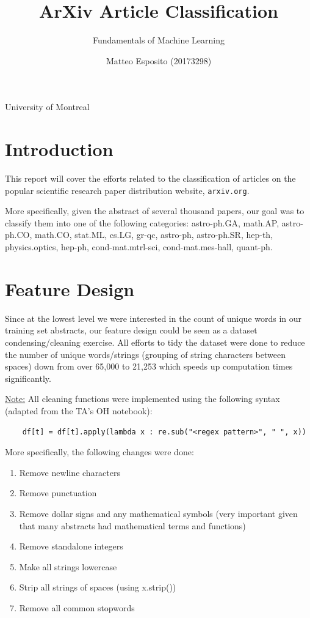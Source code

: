 \documentclass[a4paper,12pt]{article}
\title{\textbf{ArXiv Article Classification}}
\author{Fundamentals of Machine Learning}
\date{Matteo Esposito (20173298)}
\def\code#1{\texttt{#1}}
\begin{document}
\begin{titlingpage}
  \maketitle
  \centering
  \vfill
  {\large{University of Montreal}}\par
  {\large{}}
\end{titlingpage}

\newpage

\section{Introduction}

This report will cover the efforts related to the classification of articles on the popular scientific research paper distribution website, \code{arxiv.org}. 

\medskip

More specifically, given the abstract of several thousand papers, our goal was to classify them into one of the following categories: astro-ph.GA, math.AP, astro-ph.CO, math.CO, stat.ML, cs.LG, gr-qc, astro-ph, astro-ph.SR, hep-th, physics.optics, hep-ph, cond-mat.mtrl-sci, cond-mat.mes-hall, quant-ph.

\section{Feature Design}

Since at the lowest level we were interested in the count of unique words in our training set abstracts, our feature design could be seen as a dataset condensing/cleaning exercise. All efforts to tidy the dataset were done to reduce the number of unique words/strings (grouping of string characters between spaces) down from over 65,000 to 21,253 which speeds up computation times significantly. 

\medskip

\underline{Note:} All cleaning functions were implemented using the following syntax (adapted from the TA's OH notebook): 

\begin{verbatim}
    df[t] = df[t].apply(lambda x : re.sub("<regex pattern>", " ", x))
\end{verbatim}

More specifically, the following changes were done:

\begin{enumerate}
    \item Remove newline characters
    \item Remove punctuation
    \item Remove dollar signs and any mathematical symbols (very important given that many abstracts had mathematical terms and functions)
    \item Remove standalone integers 
    \item Make all strings lowercase
    \item Strip all strings of spaces (using x.strip())
    \item Remove all common stopwords
\end{enumerate}
\end{document}
